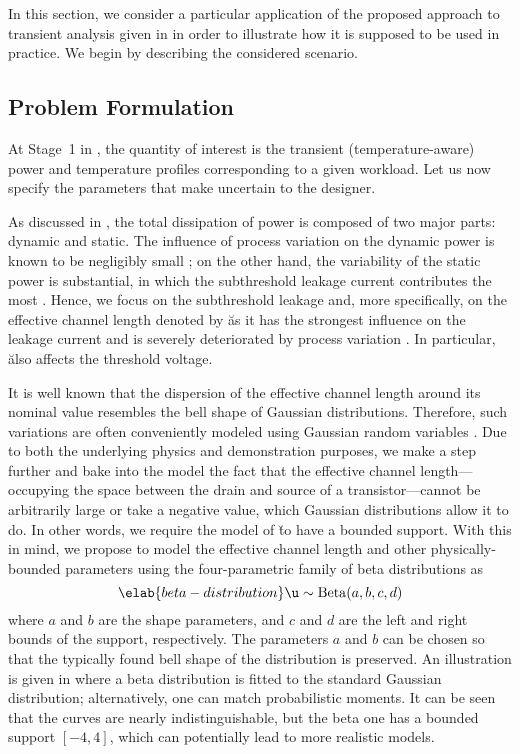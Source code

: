In this section, we consider a particular application of the proposed approach
to transient analysis given in  in order to
illustrate how it is supposed to be used in practice. We begin by describing the
considered scenario.

\subsection{Problem Formulation}

At Stage~1 in , the quantity of interest \g is the
transient (temperature-aware) power and temperature profiles corresponding to a
given workload. Let us now specify the parameters \vu that make \g uncertain to
the designer.

As discussed in , the total dissipation of power is composed
of two major parts: dynamic and static. The influence of process variation on
the dynamic power is known to be negligibly small \cite{srivastava2010}; on the
other hand, the variability of the static power is substantial, in which the
subthreshold leakage current contributes the most \cite{juan2011, juan2012}.
Hence, we focus on the subthreshold leakage and, more specifically, on the
effective channel length denoted by \u as it has the strongest influence on the
leakage current and is severely deteriorated by process variation
\cite{chandrakasan2000}. In particular, \u also affects the threshold voltage.

It is well known that the dispersion of the effective channel length around its
nominal value resembles the bell shape of Gaussian distributions. Therefore,
such variations are often conveniently modeled using Gaussian random variables
\cite{bhardwaj2006, ghanta2006, huang2009a, shen2009, chandra2010,
srivastava2010, juan2011, juan2012, lee2013}. Due to both the underlying physics
and demonstration purposes, we make a step further and bake into the model the
fact that the effective channel length---occupying the space between the drain
and source of a transistor---cannot be arbitrarily large or take a negative
value, which Gaussian distributions allow it to do. In other words, we require
the model of \u to have a bounded support. With this in mind, we propose to
model the effective channel length and other physically-bounded parameters using
the four-parametric family of beta distributions as
\begin{equation} \elab{beta-distribution}
  \u \sim \mathrm{Beta}(a, b, c, d)
\end{equation}
where $a$ and $b$ are the shape parameters, and $c$ and $d$ are the left and
right bounds of the support, respectively. The parameters $a$ and $b$ can be
chosen so that the typically found bell shape of the distribution is preserved.
An illustration is given in  where a beta distribution is
fitted to the standard Gaussian distribution; alternatively, one can match
probabilistic moments. It can be seen that the curves are nearly
indistinguishable, but the beta one has a bounded support $[-4, 4]$, which can
potentially lead to more realistic models.

